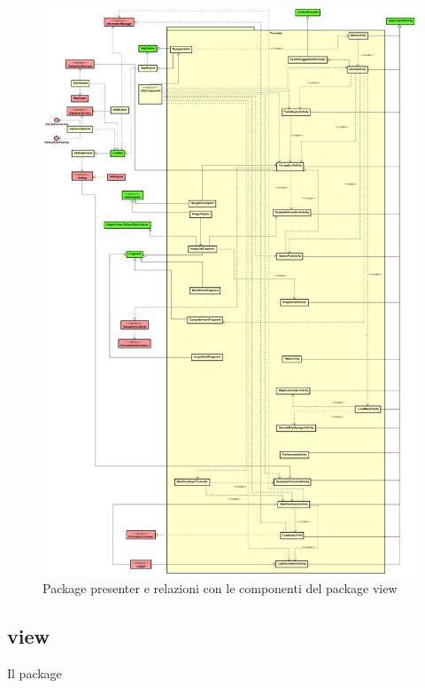 \documentclass[../DefinizioneDiProdotto.tex,lanscape]{subfiles}
\begin{document}
	
\begin{figure}[h]
	\centering
	\includegraphics[height=0.9\textheight, width=\textwidth, keepaspectratio]{diagrams/ModelCompleteNoMethods/PNGpackage/presenter}
	\caption{Package presenter e relazioni con le componenti del package view}
	\label{presenterPackage}
\end{figure}


\newpage
	\subsection{view}
		Il package
\end{document}
